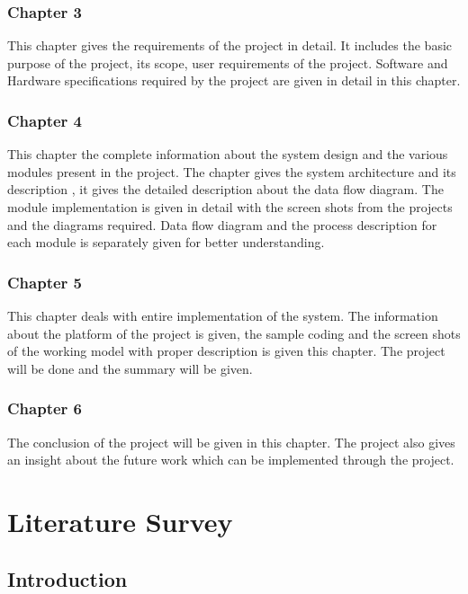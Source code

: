 \documentclass[BTech]{srmuthesis}
\begin{document}
\subsection*{Chapter 3}
This chapter gives the requirements of the project in detail. It includes the basic purpose of the project, its scope, user requirements of the project. Software and Hardware specifications required by the project are given in detail in this chapter.

\subsection*{Chapter 4}
This chapter the complete information about the system design and the various modules present in the project. The chapter gives the system architecture and its description , it gives the detailed description about the data flow diagram. The module implementation is given in detail with the screen shots from the projects and the diagrams required. Data flow diagram and the process description for each module is separately given for better understanding.

\subsection*{Chapter 5}
This chapter deals with entire implementation of the system. The information about the platform of the project is given, the sample coding and the screen shots of the working model with proper description is given this chapter. The project will be done and the summary will be given.

\subsection*{Chapter 6}
The conclusion of the project will be given in this chapter. The project also gives an insight
about the future work which can be implemented through the project.
\chapter{Literature Survey}
\section{Introduction}
\end{document}

